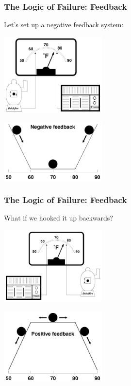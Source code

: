 \begin{frame}
\frametitle{The Logic of Failure: Feedback}
\begin{changemargin}{1cm}
Let's set up a negative feedback system:
\begin{center}
	\includegraphics[width=0.4\textwidth]{images/negativefeedbacksystem.png}
\end{center}


\begin{center}
	\includegraphics[width=0.4\textwidth]{images/negativefeedback.png}
\end{center}


\end{changemargin}
\end{frame}

\begin{frame}
\frametitle{The Logic of Failure: Feedback}
\begin{changemargin}{1cm}
What if we hooked it up backwards?
\begin{center}
	\includegraphics[width=0.4\textwidth]{images/backwardssystem.png}
\end{center}


\begin{center}
	\includegraphics[width=0.4\textwidth]{images/positivefeedback.png}
\end{center}


\end{changemargin}
\end{frame}



